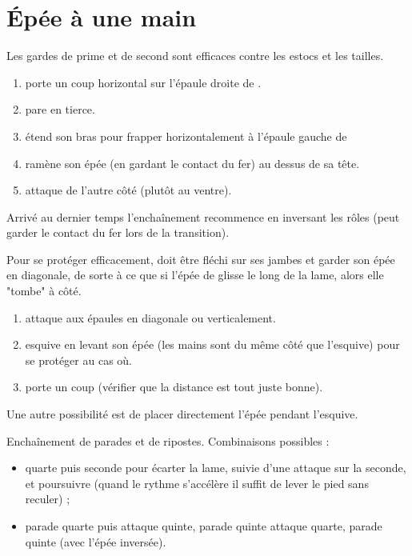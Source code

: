 \chapter{Épée à une main}


Les gardes de prime et de second sont efficaces contre les estocs et les tailles.


\begin{exercice}

\begin{enumerate}
	\item \A porte un coup horizontal sur l'épaule droite de \D.
	
	\item \D pare en tierce.
	
	\item \D étend son bras pour frapper horizontalement à l'épaule gauche de \A
	
	\item \A ramène son épée (en gardant le contact du fer) au dessus de sa tête.
	
	\item \A attaque de l'autre côté (plutôt au ventre).
\end{enumerate}

Arrivé au dernier temps l'enchaînement recommence en inversant les rôles (\D peut garder le contact du fer lors de la transition).

Pour se protéger efficacement, \A doit être fléchi sur ses jambes et garder son épée en diagonale, de sorte à ce que si l'épée de \D glisse le long de la lame, alors elle "tombe" à côté.
\end{exercice}


\begin{exercice}

\begin{enumerate}
	\item \A attaque aux épaules en diagonale ou verticalement.
	
	\item \D esquive en levant son épée (les mains sont du même côté que l'esquive) pour se protéger au cas où.
	
	\item \D porte un coup (vérifier que la distance est tout juste bonne).
\end{enumerate}

Une autre possibilité est de placer directement l'épée pendant l'esquive.
\end{exercice}


\begin{exercice}

Enchaînement de parades et de ripostes.
Combinaisons possibles :
\begin{itemize}
	\item quarte puis seconde pour écarter la lame, suivie d'une attaque sur la seconde, et poursuivre (quand le rythme s'accélère il suffit de lever le pied sans reculer) ;
	\item parade quarte puis attaque quinte, parade quinte attaque quarte, parade quinte (avec l'épée inversée).
\end{itemize}
\end{exercice}


